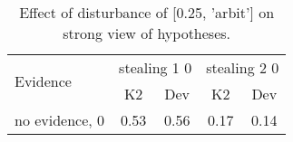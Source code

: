 \begin{table}\begin{tabular}{l|cc|cc}\toprule\multirow{2}{*}{Evidence} & \multicolumn{2}{c}{stealing 1 0}& \multicolumn{2}{c}{stealing 2 0}\\& {K2} & {Dev}& {K2} & {Dev}\\\midrule
no evidence, 0 & 0.53&0.56&0.17&0.14\\\bottomrule\end{tabular}\caption{Effect of disturbance of [0.25, 'arbit'] on strong view of hypotheses.}\end{table}